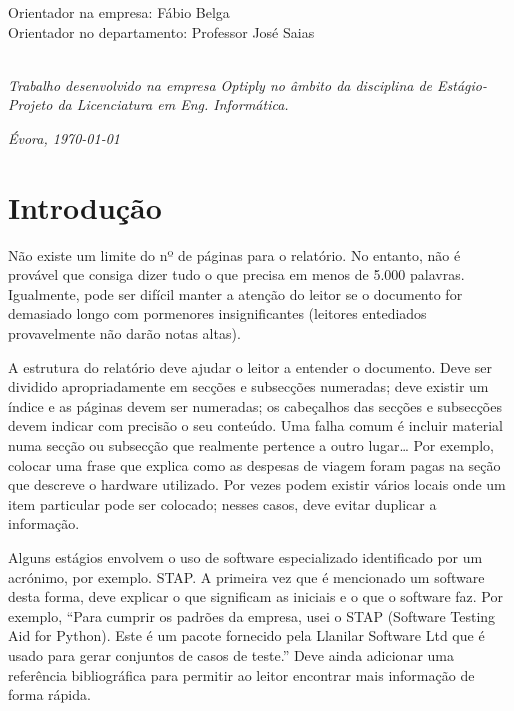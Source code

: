 \documentclass{article}
\begin{document}
\begin{titlepage}
\noindent
Orientador na empresa: Fábio Belga\\     
Orientador no departamento: Professor José Saias

\emph{\\Trabalho desenvolvido na empresa Optiply no âmbito da disciplina de Estágio-Projeto da Licenciatura em Eng. Informática.}\\ 

\begin{flushright}
\emph{Évora, \today}
\end{flushright}

\end{titlepage}


\cleardoublepage
\tableofcontents

\cleardoublepage
{}
\section{Introdução}
Não existe um limite do nº de páginas para o relatório. No entanto, não é provável que consiga dizer tudo o que precisa em menos de 5.000 palavras. Igualmente, pode ser difícil manter a atenção do leitor se o documento for demasiado longo com pormenores insignificantes (leitores entediados provavelmente não darão notas altas).

A estrutura do relatório deve ajudar o leitor a entender o documento. Deve ser dividido apropriadamente em secções e subsecções numeradas; deve existir um índice e as páginas devem ser numeradas; os cabeçalhos das secções e subsecções devem indicar com precisão o seu conteúdo. Uma falha comum é incluir material numa secção ou subsecção que realmente pertence a outro lugar… Por exemplo, colocar uma frase que explica como as despesas de viagem foram pagas na seção que descreve o hardware utilizado. Por vezes podem existir vários locais onde um item particular pode ser colocado; nesses casos, deve evitar duplicar a informação.

Alguns estágios envolvem o uso de software especializado identificado por um acrónimo, por exemplo. STAP. A primeira vez que é mencionado um software desta forma, deve explicar o que significam as iniciais e o que o software faz. Por exemplo, “Para cumprir os padrões da empresa, usei o STAP (Software Testing Aid for Python). Este é um pacote fornecido pela Llanilar Software Ltd que é usado para gerar conjuntos de casos de teste.” Deve ainda adicionar uma referência bibliográfica para permitir ao leitor encontrar mais informação de forma rápida.
\end{document}
